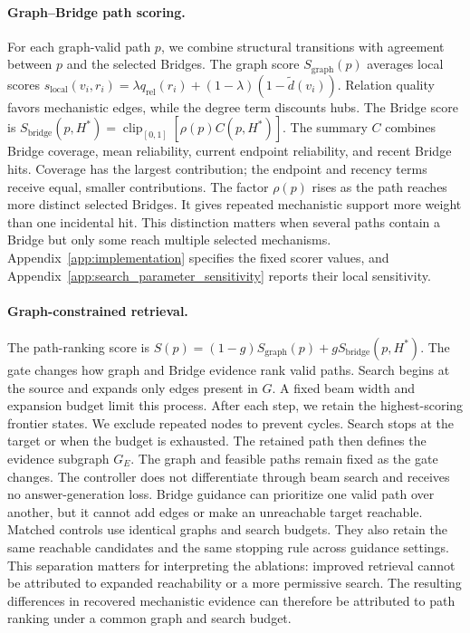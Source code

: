\documentclass{article} %
\begin{document}
\paragraph{Graph--Bridge path scoring.}
For each graph-valid path $p$, we combine structural transitions with agreement between $p$ and the selected Bridges. The graph score $S_{\mathrm{graph}}(p)$ averages local scores $s_{\mathrm{local}}(v_i,r_i)=\lambda q_{\mathrm{rel}}(r_i)+(1-\lambda)(1-\tilde d(v_i))$. Relation quality favors mechanistic edges, while the degree term discounts hubs. The Bridge score is $S_{\mathrm{bridge}}(p,H^*)=\operatorname{clip}_{[0,1]}[\rho(p)C(p,H^*)]$. The summary $C$ combines Bridge coverage, mean reliability, current endpoint reliability, and recent Bridge hits. Coverage has the largest contribution; the endpoint and recency terms receive equal, smaller contributions. The factor $\rho(p)$ rises as the path reaches more distinct selected Bridges. It gives repeated mechanistic support more weight than one incidental hit. This distinction matters when several paths contain a Bridge but only some reach multiple selected mechanisms. Appendix~\ref{app:implementation} specifies the fixed scorer values, and Appendix~\ref{app:search_parameter_sensitivity} reports their local sensitivity.

\paragraph{Graph-constrained retrieval.}
The path-ranking score is $S(p)=(1-g)S_{\mathrm{graph}}(p)+gS_{\mathrm{bridge}}(p,H^*)$. The gate changes how graph and Bridge evidence rank valid paths. Search begins at the source and expands only edges present in $G$. A fixed beam width and expansion budget limit this process. After each step, we retain the highest-scoring frontier states. We exclude repeated nodes to prevent cycles. Search stops at the target or when the budget is exhausted. The retained path then defines the evidence subgraph $G_E$. The graph and feasible paths remain fixed as the gate changes. The controller does not differentiate through beam search and receives no answer-generation loss. Bridge guidance can prioritize one valid path over another, but it cannot add edges or make an unreachable target reachable. Matched controls use identical graphs and search budgets. They also retain the same reachable candidates and the same stopping rule across guidance settings. This separation matters for interpreting the ablations: improved retrieval cannot be attributed to expanded reachability or a more permissive search. The resulting differences in recovered mechanistic evidence can therefore be attributed to path ranking under a common graph and search budget.
\end{document}
